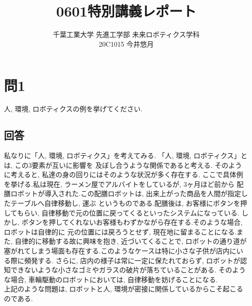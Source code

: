 \documentclass{jsarticle}
\begin{document}
\title{{\vspace*{-30mm}}{\LARGE 0601特別講義レポート}}
\author{\large 千葉工業大学 先進工学部 未来ロボティクス学科 \vspace*{4mm}\\20C1015 今井悠月}
\date{}
\maketitle\vspace*{10mm}

\section*{問1}
人, 環境, ロボティクスの例を挙げてください.

\subsection*{回答}
私なりに「人, 環境, ロボティクス」を考えてみる. \hspace*{1zw}「人, 環境, ロボティクス」とは, この3要素が互いに影響を
及ぼし合うような関係であると考える. \hspace*{1zw}そのように考えると, 私達の身の回りにはそのような状況が多く存在する.
\hspace*{1zw}ここで具体例を挙げる.\hspace*{1zw}私は現在, ラーメン屋でアルバイトをしているが, 3ヶ月ほど前から
配膳ロボットが導入された.\hspace*{1zw}この配膳ロボットは, 出来上がった商品を人間が指定したテーブルへ自律移動し, 運ぶ
というものである.\hspace*{1zw}配膳後は, お客様にボタンを押してもらい, 自律移動で元の位置に戻ってくるといったシステムになっている.
\hspace*{1zw}しかし, ボタンを押してくれないお客様もわずかながら存在する.\hspace*{1zw}そのような場合, ロボットは自律的に
元の位置には戻ろうとせず, 現在地に留まることになる.\hspace*{1zw}また, 自律的に移動する故に興味を抱き, 近づいてくることで, 
ロボットの通り道が塞がれてしまう場面も存在する.\hspace*{1zw}このようなケースは特に小さな子供が店内にいる際に頻発する.
さらに, 店内の様子は常に一定に保たれておらず, ロボットが認知できないような小さなゴミやガラスの破片が落ちていることがある.
\hspace*{1zw}そのような場合, 車輪駆動のロボットにおいては, 自律移動を妨げることになる.\\
\hspace*{1zw}上記のような問題は, ロボットと人, 環境が密接に関係しているからこそ起こるのである.
\end{document}

